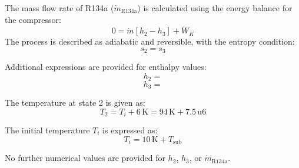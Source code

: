 The mass flow rate of R134a (\( \dot{m}_{\text{R134a}} \)) is calculated using the energy balance for the compressor:  
\[
0 = \dot{m} \left[ h_2 - h_3 \right] + \dot{W}_K
\]  
The process is described as adiabatic and reversible, with the entropy condition:  
\[
s_2 = s_3
\]  

Additional expressions are provided for enthalpy values:  
\[
h_2 = 
\]  
\[
h_3 = 
\]  

The temperature at state 2 is given as:  
\[
T_2 = T_i + 6 \, \text{K} = 94 \, \text{K} + 7.5 \, \text{u}6
\]  

The initial temperature \( T_i \) is expressed as:  
\[
T_i = 10 \, \text{K} + T_{\text{sub}}
\]  

No further numerical values are provided for \( h_2 \), \( h_3 \), or \( \dot{m}_{\text{R134a}} \).